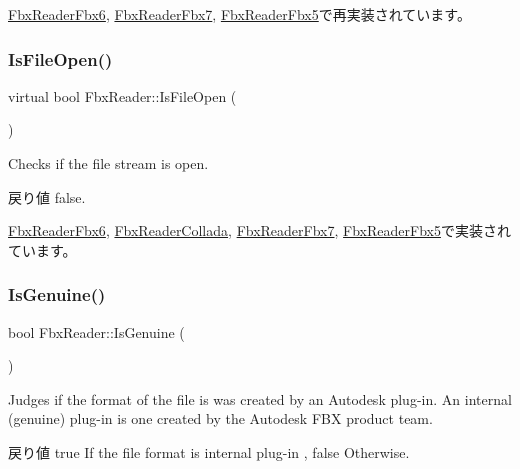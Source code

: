 \hyperlink{class_fbx_reader_fbx6_aad4206439b88a858608710d745bfd8e8}{Fbx\+Reader\+Fbx6}, \hyperlink{class_fbx_reader_fbx7_a73f54d9a13bac3952f78983ec07b6d5c}{Fbx\+Reader\+Fbx7}, \hyperlink{class_fbx_reader_fbx5_a297ed289a6d5e55f33540d8efb4bfd0b}{Fbx\+Reader\+Fbx5}で再実装されています。

\mbox{\label{class_fbx_reader_af86b437702ffc840cfab52185cbc7232}} 
\subsubsection{\texorpdfstring{Is\+File\+Open()}{IsFileOpen()}}
{\footnotesize\ttfamily virtual bool Fbx\+Reader\+::\+Is\+File\+Open (\begin{DoxyParamCaption}{ }\end{DoxyParamCaption})\hspace{0.3cm}{\ttfamily [pure virtual]}}

Checks if the file stream is open. \begin{DoxyReturn}{戻り値}
{\ttfamily false}. 
\end{DoxyReturn}


\hyperlink{class_fbx_reader_fbx6_a430304edb9e06837faacd6f25a0ed714}{Fbx\+Reader\+Fbx6}, \hyperlink{class_fbx_reader_collada_a6732d6488100827a26065750e80f3a27}{Fbx\+Reader\+Collada}, \hyperlink{class_fbx_reader_fbx7_a0b476396dddc5ed76720e28770535a10}{Fbx\+Reader\+Fbx7}, \hyperlink{class_fbx_reader_fbx5_ae610563380260e4445a8c90646898a87}{Fbx\+Reader\+Fbx5}で実装されています。

\mbox{\label{class_fbx_reader_a7c9dad350ae8255c7346b279b5cf14bf}} 
\subsubsection{\texorpdfstring{Is\+Genuine()}{IsGenuine()}}
{\footnotesize\ttfamily bool Fbx\+Reader\+::\+Is\+Genuine (\begin{DoxyParamCaption}{ }\end{DoxyParamCaption})}

Judges if the format of the file is was created by an Autodesk plug-\/in. An internal (genuine) plug-\/in is one created by the Autodesk F\+BX product team. \begin{DoxyReturn}{戻り値}
{\ttfamily true} If the file format is internal plug-\/in , {\ttfamily false} Otherwise. 
\end{DoxyReturn}
\mbox{\label{class_fbx_reader_ab5a00e2bf3c80f5167a89149b96df57c}} 
